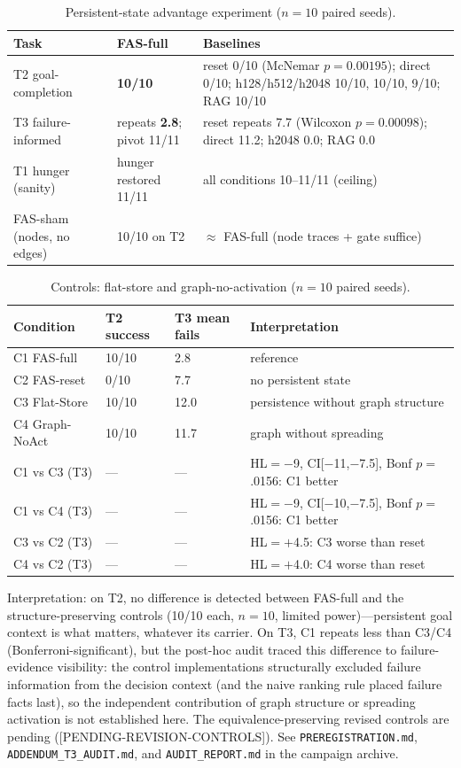 \documentclass[10pt,a4paper]{article}
\begin{document}
\begin{table}[h]
\centering\small
\caption{Persistent-state advantage experiment ($n{=}10$ paired seeds).}
\label{tab:s-psa}
\begin{tabular}{L{4.2cm}L{4.2cm}L{5.6cm}}
\toprule
\textbf{Task} & \textbf{FAS-full} & \textbf{Baselines} \\
\midrule
T2 goal-completion & \textbf{10/10} & reset 0/10 (McNemar $p{=}0.00195$); direct 0/10; h128/h512/h2048 10/10, 10/10, 9/10; RAG 10/10 \\
T3 failure-informed & repeats \textbf{2.8}; pivot 11/11 & reset repeats 7.7 (Wilcoxon $p{=}0.00098$); direct 11.2; h2048 0.0; RAG 0.0 \\
T1 hunger (sanity) & hunger restored 11/11 & all conditions 10--11/11 (ceiling) \\
\midrule
FAS-sham (nodes, no edges) & 10/10 on T2 & $\approx$ FAS-full (node traces + gate suffice) \\
\bottomrule
\end{tabular}
\end{table}

\begin{table}[h]
\centering\small
\caption{Controls: flat-store and graph-no-activation ($n{=}10$ paired seeds).}
\label{tab:s-controls}
\begin{tabular}{L{3.0cm}L{3.0cm}L{3.0cm}L{5.4cm}}
\toprule
\textbf{Condition} & \textbf{T2 success} & \textbf{T3 mean fails} & \textbf{Interpretation} \\
\midrule
C1 FAS-full & 10/10 & 2.8 & reference \\
C2 FAS-reset & 0/10 & 7.7 & no persistent state \\
C3 Flat-Store & 10/10 & 12.0 & persistence without graph structure \\
C4 Graph-NoAct & 10/10 & 11.7 & graph without spreading \\
\midrule
C1 vs C3 (T3) & --- & --- & HL${=}{-}$9, CI[$-$11,$-$7.5], Bonf $p{=}$.0156: C1 better \\
C1 vs C4 (T3) & --- & --- & HL${=}{-}$9, CI[$-$10,$-$7.5], Bonf $p{=}$.0156: C1 better \\
C3 vs C2 (T3) & --- & --- & HL${=}{+}$4.5: C3 worse than reset \\
C4 vs C2 (T3) & --- & --- & HL${=}{+}$4.0: C4 worse than reset \\
\bottomrule
\end{tabular}
\end{table}

Interpretation: on T2, no difference is detected between FAS-full and
the structure-preserving controls (10/10 each, $n{=}10$, limited
power)---persistent goal context is what matters, whatever its
carrier. On T3, C1 repeats less than C3/C4
(Bonferroni-significant), but the post-hoc audit traced this
difference to failure-evidence visibility: the control implementations
structurally excluded failure information from the decision context
(and the naive ranking rule placed failure facts last), so the
independent contribution of graph structure or spreading activation is
not established here. The equivalence-preserving revised controls are
pending ([PENDING-REVISION-CONTROLS]). See \texttt{PREREGISTRATION.md},
\texttt{ADDENDUM\_T3\_AUDIT.md}, and \texttt{AUDIT\_REPORT.md} in the
campaign archive.
\end{document}
